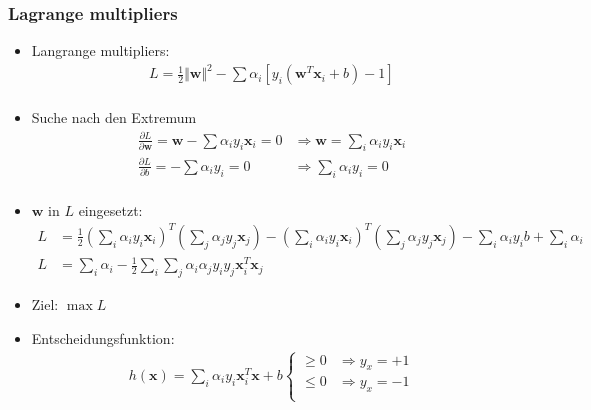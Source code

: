 \begin{frame}
    \frametitle{Lagrange multipliers}

    \begin{itemize}
        \item Langrange multipliers:
            \begin{align*}
                L = \frac{1}{2} \Vert \boldsymbol{w} \Vert^2 - \sum \alpha_i \left[ y_i ( \boldsymbol{w}^T \boldsymbol{x}_i + b) - 1 \right] \\
            \end{align*}
        \item Suche nach den Extremum
            \begin{align*}
                \frac{\partial L}{\partial \boldsymbol{w}} = \boldsymbol{w} - \sum \alpha_i y_i \boldsymbol{x}_i = 0 &\Rightarrow \boldsymbol{w} = \sum_i \alpha_i y_i \boldsymbol{x}_i \\
                \frac{\partial L}{\partial b} = -\sum \alpha_i y_i = 0 &\Rightarrow \sum_i \alpha_i y_i = 0 \\
            \end{align*}
        \item $\boldsymbol{w}$ in $L$ eingesetzt:
            \begin{align*}
                L &= \frac{1}{2} (\sum_i \alpha_i y_i \boldsymbol{x}_i)^T (\sum_j \alpha_j y_j \boldsymbol{x}_j) - (\sum_i \alpha_i y_i \boldsymbol{x}_i)^T (\sum_j \alpha_j y_j \boldsymbol{x}_j) - \sum_i \alpha_i y_i b + \sum_i \alpha_i \\
                L &= \sum_i \alpha_i - \frac{1}{2} \sum_i \sum_j \alpha_i \alpha_j y_i y_j \boldsymbol{x}_i^T \boldsymbol{x}_j
            \end{align*}
        \item Ziel: $ \max L$
        \item Entscheidungsfunktion:
            \begin{align*}
                h(\boldsymbol{x}) = \sum_i \alpha_i y_i \boldsymbol{x}_i^T \boldsymbol{x} + b \begin{cases}
                    \geq 0 & \Rightarrow y_x = +1 \\
                    \leq 0 & \Rightarrow y_x = -1 \\
                \end{cases}
            \end{align*}
    \end{itemize}
\end{frame}

